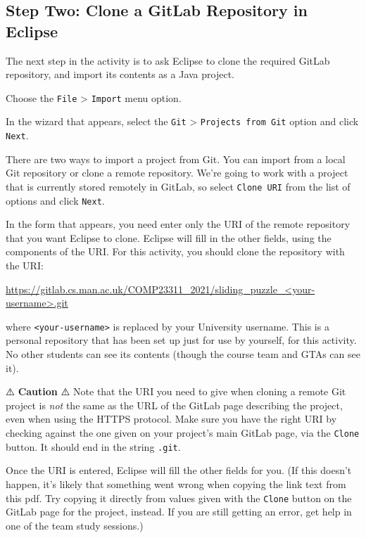 \documentclass[
]{book}
\begin{document}
\hypertarget{clone}{%
\subsection{Step Two: Clone a GitLab Repository in Eclipse}\label{clone}}

The next step in the activity is to ask Eclipse to clone the required GitLab repository, and import its contents as a Java project.

Choose the \texttt{File} \textgreater{} \texttt{Import} menu option.

In the wizard that appears, select the \texttt{Git} \textgreater{} \texttt{Projects\ from\ Git} option and click \texttt{Next}.

There are two ways to import a project from Git. You can import from a local Git repository or clone a remote repository. We're going to work with a project that is currently stored remotely in GitLab, so select \texttt{Clone\ URI} from the list of options and click \texttt{Next}.

In the form that appears, you need enter only the URI of the remote repository that you want Eclipse to clone. Eclipse will fill in the other fields, using the components of the URI. For this activity, you should clone the repository with the URI:

\href{https://gitlab.cs.man.ac.uk/COMP23311_2021/sliding_puzzle-your-username.git}{https://gitlab.cs.man.ac.uk/COMP23311\_2021/sliding\_puzzle\_\textless your-username\textgreater.git}

where \texttt{\textless{}your-username\textgreater{}} is replaced by your University username. This is a personal repository that has been set up just for use by yourself, for this activity. No other students can see its contents (though the course team and GTAs can see it).

⚠️ \textbf{Caution} ⚠️
Note that the URI you need to give when cloning a remote Git project is \emph{not} the same as the URL of the GitLab page describing the project, even when using the HTTPS protocol. Make sure you have the right URI by checking against the one given on your project's main GitLab page, via the \texttt{Clone} button. It should end in the string \texttt{.git}.

Once the URI is entered, Eclipse will fill the other fields for you. (If this doesn't happen, it's likely that something went wrong when copying the link text from this pdf. Try copying it directly from values given with the \texttt{Clone} button on the GitLab page for the project, instead. If you are still getting an error, get help in one of the team study sessions.)
\end{document}
